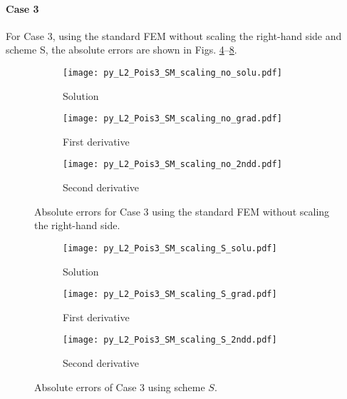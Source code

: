 \documentclass[review,3p]{elsarticle}
\begin{document}
\paragraph{Case 3}
For Case 3, using the standard FEM without scaling the right-hand side and scheme S, the absolute errors are shown in Figs. \ref{py_L2_Pois3_SM_scaling_no}--\ref{py_L2_Pois3_SM_scaling_S}.

\begin{figure}[!ht]
    \begin{subfigure}{5.5cm}
        \texttt{[image: py\_L2\_Pois3\_SM\_scaling\_no\_solu.pdf]}
        \caption{Solution}
        \label{py_L2_Pois3_SM_scaling_no_solu}
    \end{subfigure}
    \hspace{-0.2cm}
    \begin{subfigure}{5.5cm}
        \texttt{[image: py\_L2\_Pois3\_SM\_scaling\_no\_grad.pdf]}
        \caption{First derivative}
        \label{py_L2_Pois3_SM_scaling_no_grad}
    \end{subfigure}
    \hspace{-0.2cm}
    \begin{subfigure}{5.5cm}
        \texttt{[image: py\_L2\_Pois3\_SM\_scaling\_no\_2ndd.pdf]}
        \caption{Second derivative}
        \label{py_L2_Pois3_SM_scaling_no_2ndd}
    \end{subfigure}
\caption{Absolute errors for Case 3 using the standard FEM without scaling the right-hand side.}
\label{py_L2_Pois3_SM_scaling_no}
\end{figure}

\begin{figure}[!ht]
    \begin{subfigure}{5.5cm}
        \texttt{[image: py\_L2\_Pois3\_SM\_scaling\_S\_solu.pdf]}
        \caption{Solution}
        \label{py_L2_Pois3_SM_scaling_S_solu}
    \end{subfigure}
    \hspace{-0.2cm}
    \begin{subfigure}{5.5cm}
        \texttt{[image: py\_L2\_Pois3\_SM\_scaling\_S\_grad.pdf]}
        \caption{First derivative}
        \label{py_L2_Pois3_SM_scaling_S_grad}
    \end{subfigure}
    \hspace{-0.2cm}
    \begin{subfigure}{5.5cm}
        \texttt{[image: py\_L2\_Pois3\_SM\_scaling\_S\_2ndd.pdf]}
        \caption{Second derivative}
        \label{py_L2_Pois3_SM_scaling_S_2ndd}
    \end{subfigure}
\caption{Absolute errors of Case 3 using scheme $S$.}
\label{py_L2_Pois3_SM_scaling_S}
\end{figure}
\end{document}
